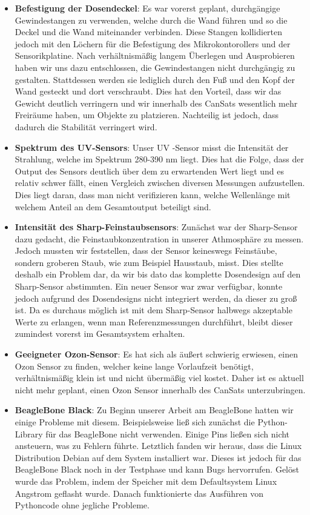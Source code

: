 \begin{itemize}
	\item \textbf{Befestigung der Dosendeckel}: Es war vorerst geplant, durchgängige Gewindestangen zu verwenden, welche durch die Wand führen und so die Deckel und die Wand miteinander verbinden. Diese Stangen kollidierten jedoch mit den Löchern für die Befestigung des Mikrokontorollers und der Sensorikplatine. Nach verhältnismäßig langem Überlegen und Ausprobieren haben wir uns dazu entschlossen, die Gewindestangen nicht durchgängig zu gestalten. Stattdessen werden sie lediglich durch den Fuß und den Kopf der Wand gesteckt und dort verschraubt. Dies hat den Vorteil, dass wir das Gewicht deutlich verringern und wir innerhalb des CanSats wesentlich mehr Freiräume haben, um Objekte zu platzieren. Nachteilig ist jedoch, dass dadurch die Stabilität verringert wird.
	\item \textbf{Spektrum des UV-Sensors}: Unser UV -Sensor misst die Intensität der Strahlung, welche im Spektrum 280-390 nm liegt. Dies hat die Folge, dass der Output des Sensors deutlich über dem zu erwartenden Wert liegt und es relativ schwer fällt, einen Vergleich zwischen diversen Messungen aufzustellen. Dies liegt daran, dass man nicht verifizieren kann, welche Wellenlänge mit welchem Anteil an dem Gesamtoutput beteiligt sind.
	\item \textbf{Intensität des Sharp-Feinstaubsensors}: Zunächst war der Sharp-Sensor dazu gedacht, die Feinstaubkonzentration in unserer Athmosphäre zu messen. Jedoch mussten wir feststellen, dass der Sensor keineswegs Feinstäube, sondern groberen Staub, wie zum Beispiel Hausstaub, misst. Dies stellte deshalb ein Problem dar, da wir bis dato das komplette Dosendesign auf den Sharp-Sensor abstimmten. Ein neuer Sensor war zwar verfügbar, konnte jedoch aufgrund des Dosendesigns nicht integriert werden, da dieser zu groß ist. Da es durchaus möglich ist mit dem Sharp-Sensor halbwegs akzeptable Werte zu erlangen, wenn man Referenzmessungen durchführt, bleibt dieser zumindest vorerst im Gesamtsystem erhalten.
	\item \textbf{Geeigneter Ozon-Sensor}: Es hat sich als äußert schwierig erwiesen, einen Ozon Sensor zu finden, welcher keine lange Vorlaufzeit benötigt, verhältnismäßig klein ist und nicht übermäßig viel kostet. Daher ist es aktuell nicht mehr geplant, einen Ozon Sensor innerhalb des CanSats unterzubringen.
	\item \textbf{BeagleBone Black}: Zu Beginn unserer Arbeit am BeagleBone hatten wir einige Probleme mit diesem. Beispielsweise ließ sich zunächst die Python-Library für das BeagleBone nicht verwenden. Einige Pins ließen sich nicht ansteuern, was zu Fehlern führte. Letztlich fanden wir heraus, dass die Linux Distribution Debian auf dem System installiert war. Dieses ist jedoch für das BeagleBone Black noch in der Testphase und kann Bugs hervorrufen. Gelöst wurde das Problem, indem der Speicher mit dem Defaultsystem Linux Angstrom geflasht wurde. Danach funktionierte das Ausführen von Pythoncode ohne jegliche Probleme.

\end{itemize}
